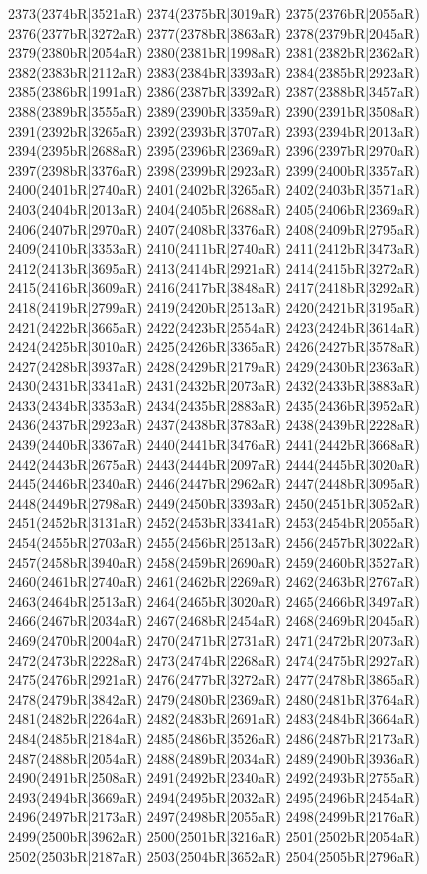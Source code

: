 2373(2374bR|3521aR) 2374(2375bR|3019aR) 2375(2376bR|2055aR) \\2376(2377bR|3272aR) 2377(2378bR|3863aR) 2378(2379bR|2045aR) 2379(2380bR|2054aR) 2380(2381bR|1998aR) 2381(2382bR|2362aR) 2382(2383bR|2112aR) 2383(2384bR|3393aR) 2384(2385bR|2923aR) \\2385(2386bR|1991aR) 2386(2387bR|3392aR) 2387(2388bR|3457aR) 2388(2389bR|3555aR) 2389(2390bR|3359aR) 2390(2391bR|3508aR) 2391(2392bR|3265aR) 2392(2393bR|3707aR) 2393(2394bR|2013aR) \\2394(2395bR|2688aR) 2395(2396bR|2369aR) 2396(2397bR|2970aR) 2397(2398bR|3376aR) 2398(2399bR|2923aR) 2399(2400bR|3357aR) 2400(2401bR|2740aR) 2401(2402bR|3265aR) 2402(2403bR|3571aR) \\2403(2404bR|2013aR) 2404(2405bR|2688aR) 2405(2406bR|2369aR) 2406(2407bR|2970aR) 2407(2408bR|3376aR) 2408(2409bR|2795aR) 2409(2410bR|3353aR) 2410(2411bR|2740aR) 2411(2412bR|3473aR) \\2412(2413bR|3695aR) 2413(2414bR|2921aR) 2414(2415bR|3272aR) 2415(2416bR|3609aR) 2416(2417bR|3848aR) 2417(2418bR|3292aR) 2418(2419bR|2799aR) 2419(2420bR|2513aR) 2420(2421bR|3195aR) \\2421(2422bR|3665aR) 2422(2423bR|2554aR) 2423(2424bR|3614aR) 2424(2425bR|3010aR) 2425(2426bR|3365aR) 2426(2427bR|3578aR) 2427(2428bR|3937aR) 2428(2429bR|2179aR) 2429(2430bR|2363aR) \\2430(2431bR|3341aR) 2431(2432bR|2073aR) 2432(2433bR|3883aR) 2433(2434bR|3353aR) 2434(2435bR|2883aR) 2435(2436bR|3952aR) 2436(2437bR|2923aR) 2437(2438bR|3783aR) 2438(2439bR|2228aR) \\2439(2440bR|3367aR) 2440(2441bR|3476aR) 2441(2442bR|3668aR) 2442(2443bR|2675aR) 2443(2444bR|2097aR) 2444(2445bR|3020aR) 2445(2446bR|2340aR) 2446(2447bR|2962aR) 2447(2448bR|3095aR) \\2448(2449bR|2798aR) 2449(2450bR|3393aR) 2450(2451bR|3052aR) 2451(2452bR|3131aR) 2452(2453bR|3341aR) 2453(2454bR|2055aR) 2454(2455bR|2703aR) 2455(2456bR|2513aR) 2456(2457bR|3022aR) \\2457(2458bR|3940aR) 2458(2459bR|2690aR) 2459(2460bR|3527aR) 2460(2461bR|2740aR) 2461(2462bR|2269aR) 2462(2463bR|2767aR) 2463(2464bR|2513aR) 2464(2465bR|3020aR) 2465(2466bR|3497aR) \\2466(2467bR|2034aR) 2467(2468bR|2454aR) 2468(2469bR|2045aR) 2469(2470bR|2004aR) 2470(2471bR|2731aR) 2471(2472bR|2073aR) 2472(2473bR|2228aR) 2473(2474bR|2268aR) 2474(2475bR|2927aR) \\2475(2476bR|2921aR) 2476(2477bR|3272aR) 2477(2478bR|3865aR) 2478(2479bR|3842aR) 2479(2480bR|2369aR) 2480(2481bR|3764aR) 2481(2482bR|2264aR) 2482(2483bR|2691aR) 2483(2484bR|3664aR) \\2484(2485bR|2184aR) 2485(2486bR|3526aR) 2486(2487bR|2173aR) 2487(2488bR|2054aR) 2488(2489bR|2034aR) 2489(2490bR|3936aR) 2490(2491bR|2508aR) 2491(2492bR|2340aR) 2492(2493bR|2755aR) \\2493(2494bR|3669aR) 2494(2495bR|2032aR) 2495(2496bR|2454aR) 2496(2497bR|2173aR) 2497(2498bR|2055aR) 2498(2499bR|2176aR) 2499(2500bR|3962aR) 2500(2501bR|3216aR) 2501(2502bR|2054aR) \\2502(2503bR|2187aR) 2503(2504bR|3652aR) 2504(2505bR|2796aR) 